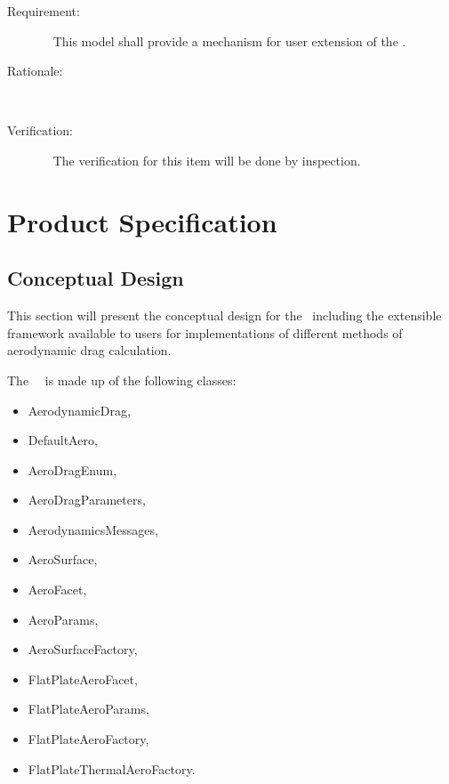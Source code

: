 \label{reqt:aero_extension}
\begin{description}
\item[Requirement:]\ \newline
This model shall provide a mechanism for user extension of the \aerodynamicsDesc.
\item[Rationale:]\ \newline
\item[Verification:]\ \newline
The verification for this item will be done by inspection.
\end{description}

\chapter{Product Specification}\label{ch:spec}

\section{Conceptual Design}

This section will present the conceptual design for the \aerodynamicsDesc\,
including the extensible framework available to users for implementations of
different methods of aerodynamic drag calculation.

The \JEODid\ \aerodynamicsDesc\ is made up of the following classes:

\begin{itemize}
\item{AerodynamicDrag},
\item{DefaultAero},
\item{AeroDragEnum},
\item{AeroDragParameters},
\item{AerodynamicsMessages},
\item{AeroSurface},
\item{AeroFacet},
\item{AeroParams},
\item{AeroSurfaceFactory},
\item{FlatPlateAeroFacet},
\item{FlatPlateAeroParams},
\item{FlatPlateAeroFactory},
\item{FlatPlateThermalAeroFactory}.
\end{itemize}

